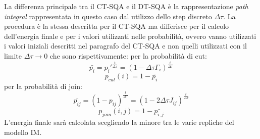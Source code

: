 La differenza principale tra il CT-SQA e il DT-SQA\cite{CODE} è la rappresentazione \textit{path integral} rappresentata in questo caso dal utilizzo dello step discreto $\Delta\tau$. La procedura è la stessa descritta per il CT-SQA ma differisce per il calcolo dell'energia finale e per i valori utilizzati nelle probabilità, ovvero vanno utilizzati i valori iniziali descritti nel paragrafo del CT-SQA e non quelli utilizzati con il limite $\Delta\tau \to 0$ che sono rispettivamente:
per la probabilità di cut:
$$\bar{p_i} = p_i'^{\frac{t}{\Delta \tau}} = (1 - \Delta \tau \Gamma_i)^\frac{t}{\Delta \tau}$$
$$p_{cut}(i) = 1 - \bar{p_i}$$
per la probabilità di join:
$$\bar{p_{ij}} = (1 - p_{ij})^\frac{t}{\Delta \tau} = (1 - 2\Delta \tau J_{ij})^\frac{t}{\Delta \tau}$$
$$p_{join}(i,j) = 1 - \bar{p_{i,j}}$$
L'energia finale sarà calcolata scegliendo la minore tra le varie repliche del modello IM.
